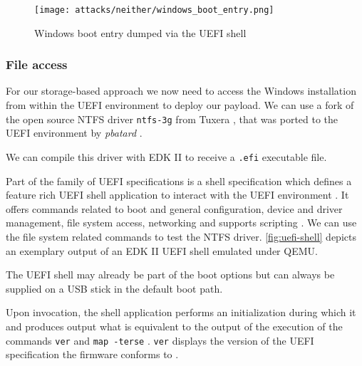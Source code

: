 \begin{figure}[htb]
    \centering
    \texttt{[image: attacks/neither/windows\_boot\_entry.png]}
    \caption{Windows boot entry dumped via the \ac{UEFI} shell}
    \label{fig:windows-boot-entry}
\end{figure}

\subsubsection{File access}

For our storage-based approach we now need to access the Windows installation from within the \ac{UEFI} environment to deploy our payload.
We can use a fork of the open source \ac{NTFS} driver \lstinline{ntfs-3g} from Tuxera \cite{ntfs-3g}, that was ported to the \ac{UEFI} environment by \emph{pbatard} \cite{ntfs-3g-uefi}.

We can compile this driver with \ac{EDK} II to receive a \lstinline{.efi} executable file.

Part of the family of \ac{UEFI} specifications is a shell specification which defines a feature rich \ac{UEFI} shell application to interact with the \ac{UEFI} environment \cite[Section 1.1]{uefi-shell-spec}.
It offers commands related to boot and general configuration, device and driver management, file system access, networking \cite[Section 5.1]{uefi-shell-spec} and supports scripting \cite[Section 4]{uefi-shell-spec}.
We can use the file system related commands to test the \ac{NTFS} driver.
\autoref{fig:uefi-shell} depicts an exemplary output of an \ac{EDK} II \ac{UEFI} shell emulated under QEMU.

The \ac{UEFI} shell may already be part of the boot options but can always be supplied on a \ac{USB} stick in the default boot path.

Upon invocation, the shell application performs an initialization during which it  and produces output what is equivalent to the output of the execution of the commands \lstinline{ver} and \lstinline{map -terse} \cite[3.3 Initialization]{uefi-shell-spec}.
\lstinline{ver} displays the version of the \ac{UEFI} specification the firmware conforms to \cite[5.3 Shell Commands]{uefi-shell-spec}.


